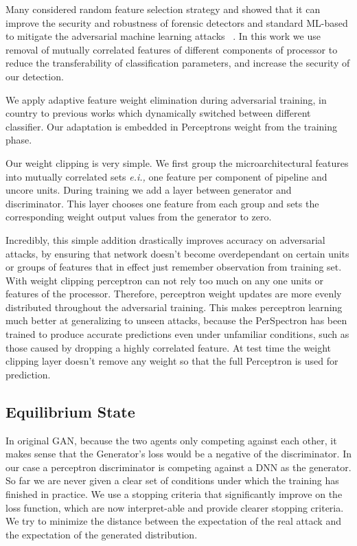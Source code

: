 Many considered random feature selection
strategy and showed that it can improve the security and robustness of forensic detectors and
standard ML-based to mitigate the adversarial machine learning attacks ~\cite{nowroozi2020survey, secureDetection2019}.
 In this work we use removal of mutually correlated features of different components of processor to reduce the transferability of classification parameters, and increase the security of our 
detection. 

We apply adaptive feature weight elimination during adversarial training, in country to previous works which dynamically switched between different classifier. Our adaptation is embedded in Perceptrons weight from the training phase.  

Our weight clipping is very simple. We first group the microarchitectural features into mutually correlated sets {\em e.i.,} one feature per component of pipeline and uncore units. During training we add a layer between generator and discriminator. This layer chooses one feature from each group and sets the corresponding weight output values from the generator to zero.

Incredibly, this simple addition drastically improves accuracy on adversarial attacks, by ensuring that network doesn't become overdependant on certain units or groups of features that in effect just remember observation from training set. With weight clipping perceptron can not rely too much on any one units or features of the processor. Therefore, perceptron weight updates are more evenly distributed throughout the adversarial training. This makes perceptron learning much better at generalizing to unseen attacks, because the PerSpectron has been trained to produce accurate predictions even under unfamiliar conditions, such as those caused by dropping a highly correlated feature. At test time the weight clipping layer doesn't remove any weight so that the full Perceptron is used for prediction. 





\subsection{\scheme{} Equilibrium State }
In original GAN, because the two agents only competing against each other, it makes sense that the Generator's loss would be a negative of the discriminator. In our case a perceptron discriminator is competing against a DNN as the generator.  So far we are never given a clear set of conditions under which the training has finished in practice.
We use a stopping criteria that significantly improve on the loss function, which are now interpret-able and provide clearer stopping criteria. We try to minimize the distance between the expectation of the real attack and the expectation of the generated distribution.  

